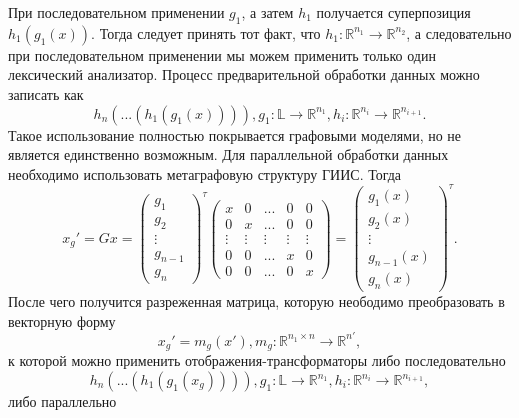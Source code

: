 При последовательном применении $g_1$, а затем $h_1$ получается суперпозиция $h_1(g_1(x))$. Тогда следует принять тот факт, что  $h_1:\mathbb{R}^{n_1} \to \mathbb{R}^{n_2}$, а следовательно при последовательном применении мы можем применить только один лексический анализатор. Процесс предварительной обработки данных можно записать как 
$$h_n(...(h_1(g_1(x)))), g_1 : \mathbb{L} \to \mathbb{R}^{n_1}, h_i:\mathbb{R}^{n_{i}} \to \mathbb{R}^{n_{i+1}}. $$
Такое использование полностью покрывается графовыми моделями, но не является единственно возможным. Для параллельной обработки данных необходимо использовать метаграфовую структуру ГИИС. Тогда 
$$x_g' = Gx =
\left(
\begin{array}{c}
g_1 \\
g_2\\
\vdots \\
g_{n-1}\\ 
g_{n}
\end{array}
\right)^{\tau}
\left(
\begin{array}{ccccc}
x & 0 & ... &  0 & 0 \\
0 & x & ... & 0 & 0 \\
\vdots & \vdots & \vdots & \vdots & \vdots \\
0 & 0 & ... & x & 0 \\
0 & 0 & ... & 0 & x
\end{array}
\right)  = 
\left(
\begin{array}{c}
g_1(x) \\
g_2(x)\\
\vdots \\
g_{n-1}(x)\\ 
g_n(x)
\end{array}
\right)^{\tau}.
$$ 
После чего получится разреженная матрица, которую неободимо преобразовать в векторную форму
$$x_{g}' = m_g(x'), m_g : \mathbb{R}^{n_1 \times n} \to \mathbb{R}^{n'},$$
к которой можно применить отображения-трансформаторы либо последовательно
$$h_n(...(h_1(g_1(x_{g})))), g_1 : \mathbb{L} \to \mathbb{R}^{n_1}, h_i:\mathbb{R}^{n_{i}} \to \mathbb{R}^{n_{i+1}},$$
либо параллельно
